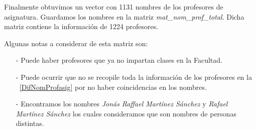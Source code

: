 \begin{table}[h]
\centering
{} 
\caption[\textit{Diferencias en nombres de profesores de asignatura}]{\textit{Se muestran los nombres de los profesores de asignatura que se eliminaron por estar repetidos a causa de diferencias en el nombre como acentos, guiones o nombre incompleto.}}\label{DifNomProfasig}
\end{table}


Finalmente obtuvimos un vector con 1131 nombres de los profesores de asignatura. Guardamos los nombres en la matriz \textit{mat\_nom\_prof\_total}. Dicha matriz contiene la información de 1224 profesores.

Algunas notas a considerar de esta matriz son:
  
\begin{itemize}
\item[-] Puede haber profesores que ya no impartan clases en la Facultad.

\item[-] Puede ocurrir que no se recopile toda la información de los profesores en la \tablename{~\ref{DifNomProfasig}} por no haber coincidencias en los nombres.

\item[-] Encontramos los nombres \textit{Jonás Raffael Martínez Sánchez} y \textit{Rafael Martínez Sánchez} los cuales consideramos que son nombres de personas distintas.

\end{itemize}

